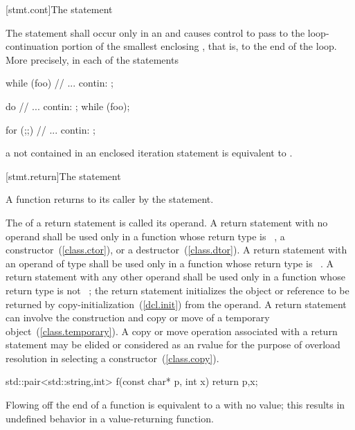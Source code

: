 [stmt.cont]{The  statement}%

\pnum
The
statement shall occur only in an
%
and causes control to pass to the loop-continuation portion of the
smallest enclosing , that is, to the end
of the loop. More precisely, in each of the statements

\begin{minipage}{.30\hsize}
\begin{codeblock}
while (foo) {
  {
    // ...
  }
contin: ;
}
\end{codeblock}
\end{minipage}
\begin{minipage}{.30\hsize}
\begin{codeblock}
do {
  {
    // ...
  }
contin: ;
} while (foo);
\end{codeblock}
\end{minipage}
\begin{minipage}{.30\hsize}
\begin{codeblock}
for (;;) {
  {
    // ...
  }
contin: ;
}
\end{codeblock}
\end{minipage}

a  not contained in an enclosed iteration statement is
equivalent to  .

[stmt.return]{The  statement}%
%
%

\pnum
A function returns to its caller by the  statement.

\pnum
The 
of a return statement is called its operand. A return statement with
no operand shall be used only in a function whose return type is
\cv\ , a constructor~(\ref{class.ctor}), or a
destructor~(\ref{class.dtor}).
%
%
A return statement with an operand of type  shall be used only
in a function whose return type is \cv\ .
A return statement with any other operand shall be used only
in a function whose return type is not \cv\ ;
%
the return statement initializes the object or reference to be returned
by copy-initialization~(\ref{dcl.init}) from the operand.
\enternote
A return statement can involve the
construction and copy or move of a temporary object~(\ref{class.temporary}).
A copy or move operation associated with a return statement may be elided or
considered as an rvalue for the purpose of overload resolution in
selecting a constructor~(\ref{class.copy}).
\exitnote
\enterexample
\begin{codeblock}
std::pair<std::string,int> f(const char* p, int x) {
  return {p,x};
}
\end{codeblock}
\exitexample
Flowing off the end of a function is equivalent to a  with
no value; this results in undefined behavior in a value-returning
function.

